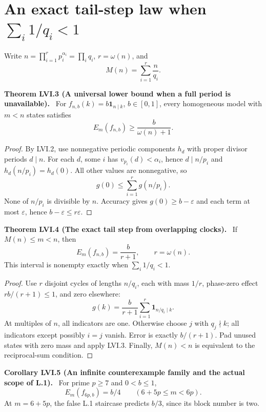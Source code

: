 \documentclass[11pt,a4paper,oneside]{book}
\newcommand{\one}{\mathbf 1}\newcommand{\ii}{\mathrm i}\newcommand{\dd}{\mathrm d}
\newcommand{\statement}[3]{\par\medskip\noindent\textbf{#1 #2 (#3).}\ }
\begin{document}
\section{An exact tail-step law when $\sum_i1/q_i<1$}
Write $n=\prod_{i=1}^rp_i^{\alpha_i}=\prod_iq_i$, $r=\omega(n)$, and
\begin{equation}M(n)=\sum_{i=1}^r\frac n{q_i}.\tag{342}\end{equation}
\statement{Theorem}{LVI.3}{A universal lower bound when a full period is unavailable}
For $f_{n,b}(k)=b\one_{n\mid k}$, $b\in[0,1]$, every homogeneous model with $m<n$ states satisfies
\begin{equation}E_m(f_{n,b})\ge\frac b{\omega(n)+1}.\tag{343}\end{equation}
\begin{proof}
By LVI.2, use nonnegative periodic components $h_d$ with proper divisor periods $d\mid n$. For each $d$, some $i$ has $v_{p_i}(d)<\alpha_i$, hence $d\mid n/p_i$ and $h_d(n/p_i)=h_d(0)$. All other values are nonnegative, so
\begin{equation}g(0)\le\sum_{i=1}^rg(n/p_i).\tag{344}\end{equation}
None of $n/p_i$ is divisible by $n$. Accuracy gives $g(0)\ge b-\varepsilon$ and each term at most $\varepsilon$, hence $b-\varepsilon\le r\varepsilon$.
\end{proof}
\statement{Theorem}{LVI.4}{The exact tail step from overlapping clocks}
If $M(n)\le m<n$, then
\begin{equation}E_m(f_{n,b})=\frac b{r+1},\qquad r=\omega(n).\tag{345}\end{equation}
This interval is nonempty exactly when $\sum_i1/q_i<1$.
\begin{proof}
Use $r$ disjoint cycles of lengths $n/q_i$, each with mass $1/r$, phase-zero effect $rb/(r+1)\le1$, and zero elsewhere:
\begin{equation}g(k)=\frac b{r+1}\sum_{i=1}^r\one_{n/q_i\mid k}.\tag{346}\end{equation}
At multiples of $n$, all indicators are one. Otherwise choose $j$ with $q_j\nmid k$; all indicators except possibly $i=j$ vanish. Error is exactly $b/(r+1)$. Pad unused states with zero mass and apply LVI.3. Finally, $M(n)<n$ is equivalent to the reciprocal-sum condition.
\end{proof}
\statement{Corollary}{LVI.5}{An infinite counterexample family and the actual scope of L.1}
For prime $p\ge7$ and $0<b\le1$,
\begin{equation}E_m(f_{6p,b})=b/4\qquad(6+5p\le m<6p).\tag{347}\end{equation}
At $m=6+5p$, the false L.1 staircase predicts $b/3$, since its block number is two.
\end{document}
